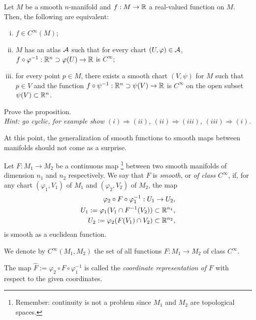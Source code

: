 \begin{proposition}
  Let $M$ be a smooth $n$-manifold and $f:M\to\mathbb{R}$ a real-valued function on $M$. Then, the following are equivalent:
  \begin{enumerate}[(i)]
    \item $f\in C^\infty(M)$;
    \item $M$ has an atlas $\mathcal{A}$ such that for every chart $(U, \varphi)\in\mathcal{A}$, $f\circ \varphi^{-1} : \mathbb{R}^n\supset\varphi(U)\to \mathbb{R}$ is $C^\infty$;
    \item for every point $p\in M$, there exists a smooth chart $(V,\psi)$ for $M$ such that $p\in V$ and the function $f\circ\psi^{-1} : \mathbb{R}^n\supset\psi(V)\to \mathbb{R}$ is $C^\infty$ on the open subset $\psi(V)\subset\mathbb{R}^n$.
  \end{enumerate}
\end{proposition}

\begin{exercise}
  Prove the proposition.\\
  \textit{\small Hint: go cyclic, for example show $(i)\Rightarrow(ii)$, $(ii)\Rightarrow(iii)$, $(iii)\Rightarrow(i)$.}
\end{exercise}

At this point, the generalization of smooth functions to smooth maps between manifolds should not come as a surprise.

\begin{definition}
  Let $F:M_1\to M_2$ be a continuous map \footnote{Remember: continuity is not a problem since $M_1$ and $M_2$ are topological spaces.} between two smooth manifolds of dimension $n_1$ and $n_2$ respectively.
  We say that $F$ is \emph{smooth}, or \emph{of class $C^\infty$}, if, for any chart $(\varphi_1, V_1)$ of $M_1$ and $(\varphi_2, V_2)$ of $M_2$, the map
  \begin{align}
    \varphi_2 \circ F \circ \varphi_1^{-1}: U_1 \to U_2,\\
    U_1 := \varphi_1(V_1 \cap F^{-1}(V_2))\subset\mathbb{R}^{n_1},\\
    U_2 := \varphi_2(F(V_1) \cap V_2)\subset\mathbb{R}^{n_2},
  \end{align}
  is smooth as a euclidean function.

  We denote by $C^\infty(M_1, M_2)$ the set of all functions $F:M_1\to M_2$ of class $C^\infty$.

  The map $\hat F := \varphi_2 \circ F \circ \varphi_1^{-1}$ is called the \emph{coordinate representation of $F$} with respect to the given coordinates.
\end{definition}

